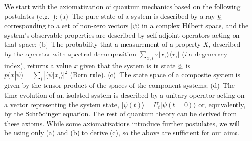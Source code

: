\documentclass[aps,prl,amsmath,amssymb,twocolumn]{revtex4}
\theoremstyle{plain}
\theoremstyle{definition}
\theoremstyle{remark}
\newcommand{\pj}[1] {\underbar{$#1$}}
\def\>{\rangle}
\def\<{\langle}
\def\comment#1{}
\def\commentg#1{ [{\bf Comment Gabriele:} {\sf #1}]}
\def\togli#1{}
\begin{document}
	We start with the axiomatization of quantum mechanics based on the following
	postulates (e.g.~\cite{ozawa,masanes,wootters,nielsenchuang}): (a)~The pure state of a
	system is described by a ray $\pj{\psi}$ corresponding to a set of
	non-zero vectors $|\psi\>$ in a complex Hilbert space, and the
	system's observable properties are described by self-adjoint operators
	acting on that space; (b)~The probability that a measurement of a
	property $X$, described by the operator with spectral decomposition \comment{Normalizzare qui e in altri posti!}
	$\sum_{x,i}x|x_i\>\<x_i|$ ($i$ a degeneracy index), returns a value
	$x$ given that the system is in state $\pj{\psi}$ is
	$p(x|\psi)=\sum_i|\<\psi|x_i\>|^2$ (Born rule). (c)~The state
	space of a composite system is given by the tensor product of the
	spaces of the component systems; (d)~The time evolution of an isolated
	system is described by a unitary operator acting on a vector
	representing the system state, $|\psi({t})\>=U_{t}|\psi({t}=0)\>$ or,
	equivalently, by the Schr\"odinger equation. The rest of quantum
	theory can be derived from these axioms. While some axiomatizations
	introduce further postulates, we will be using only (a) and (b) to
	derive (c), so the above are sufficient for our aims.
	
	\togli{This axiomatization implicitly contains a definition of
		``quantum system'' which is crucial for what follows, so we need to
		clarify the assumptions that it contains. We will use the following
		definition for a quantum
		system\togli{$\stackon[1pt]={\mbox{\tiny
					def}}$}$\stackrel{\mbox{\tiny def}}=${\em ``a quantum degree
			of freedom with $d$ (possibly discrete, or continuous, infinite)
			mutually exclusive (commuting) values for each of its properties.
			Its mathematical description is through a Hilbert space of
			dimension $d$ which contains all the states that describe the
			values of its possible properties. In accordance with the
			postulate (a), these values correspond to a basis of the space,
			given by the eigenvectors of the observable corresponding to that
			property''}. \commentg{We may have to revise to be more clear.
			Where is this used?} }
	
\end{document}
